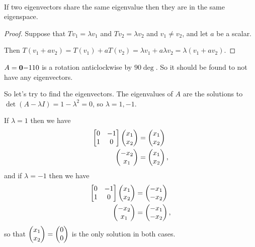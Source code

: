 \begin{remark*}~\\
  If two eigenvectors share the same eigenvalue then they are in the same eigenspace.
\end{remark*}

\begin{proof}
  Suppose that $Tv_1 = \lambda v_1$ and $Tv_2 = \lambda v_2$ and
  $v_1 \neq v_2$, and let $a$ be a scalar.

  Then
  $T(v_1 + av_2) = T(v_1) + aT(v_2) = \lambda v_1 + a\lambda v_2 = \lambda(v_1
  + av_2)$.
\end{proof}



\begin{example*}
  $A = \mathbf
  {0}{-1}
  {1}{0}$ is a rotation anticlockwise by $90\deg$. So it should be found to not
  have any eigenvectors.

  So let's try to find the eigenvectors. The eigenvalues of $A$ are the solutions to
  $\det (A - \lambda I) = 1 -\lambda^2 = 0$, so $\lambda = 1, -1$.

  If $\lambda = 1$ then we have
  \begin{align*}
    \begin{bmatrix}0 & -1\\1 & 0\\ \end{bmatrix}\begin{pmatrix}x_1\\x_2\end{pmatrix} &= \begin{pmatrix}x_1\\x_2\end{pmatrix} \\
    \begin{pmatrix}-x_2\\x_1\end{pmatrix} &= \begin{pmatrix}x_1\\x_2\end{pmatrix},
  \end{align*}
  and if $\lambda = -1$ then we have
  \begin{align*}
    \begin{bmatrix}0 & -1\\1 & 0\\ \end{bmatrix}\begin{pmatrix}x_1\\x_2\end{pmatrix} &= \begin{pmatrix}-x_1\\-x_2\end{pmatrix} \\
    \begin{pmatrix}-x_2\\x_1\end{pmatrix} &= \begin{pmatrix}-x_1\\-x_2\end{pmatrix},
  \end{align*}
  so that $\begin{pmatrix}x_1\\x_2\end{pmatrix} = \begin{pmatrix}0\\0\end{pmatrix}$ is the only solution in both cases.
\end{example*}

